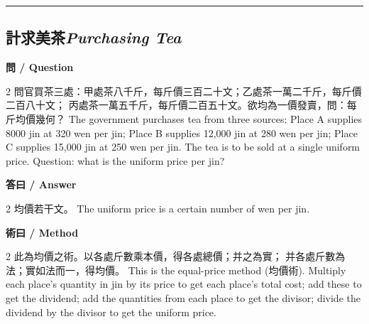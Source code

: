 \documentclass[11pt,a4paper]{article}
\newcommand{\bilingualsubsection}[2]{\subsection{#1\quad\textit{#2}}}
\newcommand{\longline}{\noindent\rule{\textwidth}{0.4pt}}
\begin{document}
\vspace{0.5em}
\longline

\bilingualsubsection{計求美茶}{Purchasing Tea}

\vspace{0.4em}
\noindent\textbf{\textcolor{chinesecolor}{問} / \textcolor{englishcolor}{Question}}
\vspace{0.3em}
\begin{paracol}{2}
問官買茶三處：甲處茶八千斤，每斤價三百二十文；乙處茶一萬二千斤，每斤價二百八十文；
丙處茶一萬五千斤，每斤價二百五十文。欲均為一價發賣，問：每斤均價幾何？
\switchcolumn
The government purchases tea from three sources: Place A supplies 8000 jin
at 320 wen per jin; Place B supplies 12{,}000 jin at 280 wen per jin; Place C
supplies 15{,}000 jin at 250 wen per jin. The tea is to be sold at a single
uniform price. Question: what is the uniform price per jin?
\end{paracol}

\vspace{0.4em}
\noindent\textbf{\textcolor{chinesecolor}{答曰} / \textcolor{englishcolor}{Answer}}
\vspace{0.2em}
\begin{paracol}{2}
均價若干文。
\switchcolumn
The uniform price is a certain number of wen per jin.
\end{paracol}

\vspace{0.4em}
\noindent\textbf{\textcolor{chinesecolor}{術曰} / \textcolor{englishcolor}{Method}}
\vspace{0.2em}
\begin{paracol}{2}
此為均價之術。以各處斤數乘本價，得各處總價；并之為實；
并各處斤數為法；實如法而一，得均價。
\switchcolumn
This is the equal-price method (均價術). Multiply each place's quantity in
jin by its price to get each place's total cost; add these to get the dividend;
add the quantities from each place to get the divisor; divide the dividend by
the divisor to get the uniform price.
\end{paracol}
\end{document}
